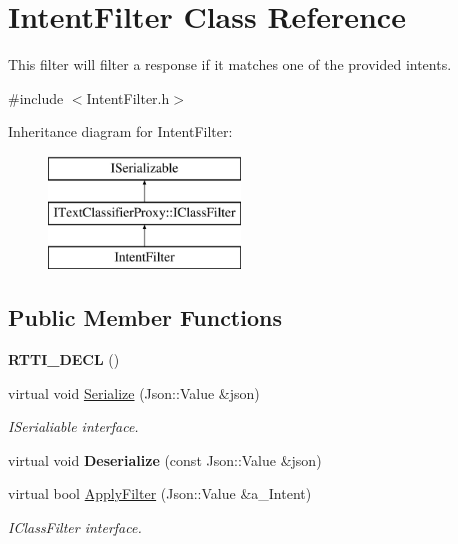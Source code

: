 \hypertarget{class_intent_filter}{}\section{Intent\+Filter Class Reference}
\label{class_intent_filter}


This filter will filter a response if it matches one of the provided intents.  




{\ttfamily \#include $<$Intent\+Filter.\+h$>$}

Inheritance diagram for Intent\+Filter\+:\begin{figure}[H]
\begin{center}
\leavevmode
\includegraphics[height=3.000000cm]{class_intent_filter}
\end{center}
\end{figure}
\subsection*{Public Member Functions}
\begin{DoxyCompactItemize}
\item 
\mbox{\label{class_intent_filter_a99b84d56ef2fbc4827552e5f50445694}} 
{\bfseries R\+T\+T\+I\+\_\+\+D\+E\+CL} ()
\item 
\mbox{\label{class_intent_filter_aa5c7fef78850a767601fa10668a5a683}} 
virtual void \hyperlink{class_intent_filter_aa5c7fef78850a767601fa10668a5a683}{Serialize} (Json\+::\+Value \&json)
\begin{DoxyCompactList}\small\item\em I\+Serialiable interface. \end{DoxyCompactList}\item 
\mbox{\label{class_intent_filter_a04fc2e0b0bbf8c5e7efb9534b497dcb8}} 
virtual void {\bfseries Deserialize} (const Json\+::\+Value \&json)
\item 
\mbox{\label{class_intent_filter_ae3eebb450b2298d457a2fd45fdfeada6}} 
virtual bool \hyperlink{class_intent_filter_ae3eebb450b2298d457a2fd45fdfeada6}{Apply\+Filter} (Json\+::\+Value \&a\+\_\+\+Intent)
\begin{DoxyCompactList}\small\item\em I\+Class\+Filter interface. \end{DoxyCompactList}\end{DoxyCompactItemize}
